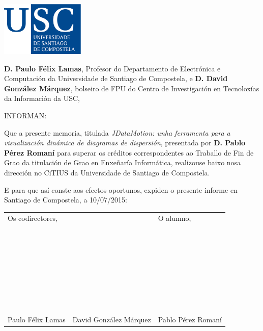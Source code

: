 \pagestyle{plain}
\includegraphics[width=4cm]{figuras/logo_usc.eps}

\vspace{1cm}
{\bf D. Paulo Félix Lamas}, Profesor do Departamento de Electrónica e Computación da Universidade de Santiago de Compostela, e {\bf D. David González Márquez}, bolseiro de FPU do Centro de Investigación en Tecnoloxías da Información da USC,

\vspace{1cm}
INFORMAN:

\vspace{1cm}
Que a presente memoria, titulada {\it JDataMotion: unha ferramenta para a visualización dinámica de diagramas de dispersión}, presentada por {\bf D. Pablo Pérez Romaní} para superar os créditos correspondentes ao Traballo de Fin de Grao da titulación de Grao en Enxeñaría Informática, realizouse baixo nosa dirección no CiTIUS da Universidade de Santiago de Compostela.

\vspace{1cm}
E para que así conste aos efectos oportunos, expiden o presente informe en Santiago de Compostela, a 10/07/2015:

\vspace{2cm}
\begin{tabular}{lll}
Os codirectores, && O alumno, \\
~ \\
~ \\
~ \\
~ \\
~ \\
~ \\
~ \\
Paulo Félix Lamas & David González Márquez & Pablo Pérez Romaní
\end{tabular}

